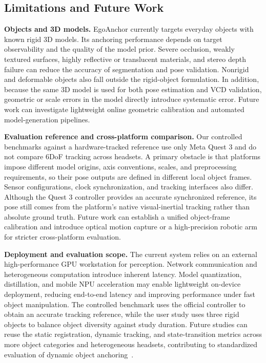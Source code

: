 \documentclass[review]{vgtc}
\begin{document}
\subsection{Limitations and Future Work}

\textbf{Objects and 3D models.}
EgoAnchor currently targets everyday objects with known rigid 3D models. Its anchoring performance depends on target observability and the quality of the model prior. Severe occlusion, weakly textured surfaces, highly reflective or translucent materials, and stereo depth failure can reduce the accuracy of segmentation and pose validation. Nonrigid and deformable objects also fall outside the rigid-object formulation. In addition, because the same 3D model is used for both pose estimation and VCD validation, geometric or scale errors in the model directly introduce systematic error. Future work can investigate lightweight online geometric calibration and automated model-generation pipelines.

\textbf{Evaluation reference and cross-platform comparison.}
Our controlled benchmarks against a hardware-tracked reference use only Meta Quest 3 and do not compare 6DoF tracking across headsets. A primary obstacle is that platforms impose different model origins, axis conventions, scales, and preprocessing requirements, so their pose outputs are defined in different local object frames. Sensor configurations, clock synchronization, and tracking interfaces also differ. Although the Quest 3 controller provides an accurate synchronized reference, its pose still comes from the platform's native visual-inertial tracking rather than absolute ground truth. Future work can establish a unified object-frame calibration and introduce optical motion capture or a high-precision robotic arm for stricter cross-platform evaluation.

\textbf{Deployment and evaluation scope.}
The current system relies on an external high-performance GPU workstation for perception. Network communication and heterogeneous computation introduce inherent latency. Model quantization, distillation, and mobile NPU acceleration may enable lightweight on-device deployment, reducing end-to-end latency and improving performance under fast object manipulation. The controlled benchmark uses the official controller to obtain an accurate tracking reference, while the user study uses three rigid objects to balance object diversity against study duration. Future studies can reuse the static registration, dynamic tracking, and state-transition metrics across more object categories and heterogeneous headsets, contributing to standardized evaluation of dynamic object anchoring~\cite{cheng2024tracking,hu2024applemeta,hu2025xrrealitycheck}.
\end{document}
